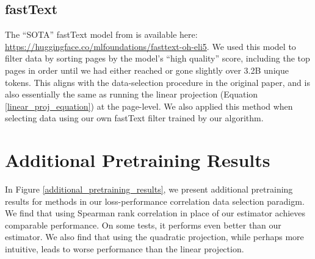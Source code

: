 \documentclass{article} %
\begin{document}
\subsection{fastText}

The ``SOTA'' fastText model from \citet{datacomp} is available here:
\url{https://huggingface.co/mlfoundations/fasttext-oh-eli5}. We used this model to filter data by sorting pages by the model's ``high quality'' score, including the top pages in order until we had either reached or gone slightly over 3.2B unique tokens. This aligns with the data-selection procedure in the original paper, and is also essentially the same as running the linear projection (Equation \ref{linear_proj_equation}) at the page-level. We also applied this method when selecting data using our own fastText filter trained by our algorithm.

\section{Additional Pretraining Results}
\label{additional_pretraining_results_appendix}

In Figure \ref{additional_pretraining_results}, we present additional pretraining results for methods in our loss-performance correlation data selection paradigm. We find that using Spearman rank correlation \citep{spearmanr} in place of our estimator achieves comparable performance. On some tests, it performs even better than our estimator. We also find that using the quadratic projection, while perhaps more intuitive, leads to worse performance than the linear projection.
\end{document}
